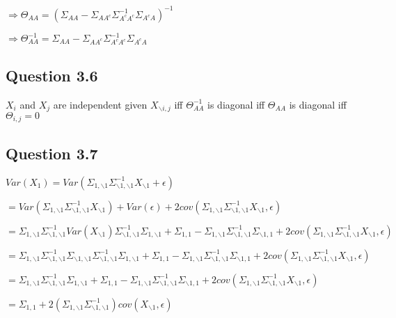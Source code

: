 \documentclass[
]{article}
\begin{document}
\(\Rightarrow \Theta_{AA} = (\Sigma_{AA} - \Sigma_{AA^c}\Sigma_{A^cA^c}^{-1}\Sigma_{A^cA})^{-1}\)

\(\Rightarrow \Theta_{AA}^{-1} = \Sigma_{AA} - \Sigma_{AA^c}\Sigma_{A^cA^c}^{-1}\Sigma_{A^cA}\)

\hypertarget{question-3.6}{%
\subsection{Question 3.6}\label{question-3.6}}

\(X_i\) and \(X_j\) are independent given \(X_{\backslash{i, j}}\) iff
\(\Theta_{AA}^{-1}\) is diagonal iff \(\Theta_{AA}\) is diagonal iff
\(\Theta_{i, j} = 0\)

\hypertarget{question-3.7}{%
\subsection{Question 3.7}\label{question-3.7}}

\(Var(X_1)=Var(\Sigma_{1,\backslash1}\Sigma^{-1}_{\backslash1,\backslash1}X_{\backslash1}+\epsilon)\)

\(=Var(\Sigma_{1,\backslash1}\Sigma^{-1}_{\backslash1,\backslash1}X_{\backslash1})+Var(\epsilon)+2cov(\Sigma_{1,\backslash1}\Sigma^{-1}_{\backslash1,\backslash1}X_{\backslash1},\epsilon)\)

\(=\Sigma_{1,\backslash1}\Sigma^{-1}_{\backslash1,\backslash1}Var(X_{\backslash1})\Sigma^{-1}_{\backslash1,\backslash1}\Sigma_{1,\backslash1}+\Sigma_{1,1}-\Sigma_{1,\backslash1}\Sigma^{-1}_{\backslash1,\backslash1}\Sigma_{\backslash1,1}+2cov(\Sigma_{1,\backslash1}\Sigma^{-1}_{\backslash1,\backslash1}X_{\backslash1},\epsilon)\)

\(=\Sigma_{1,\backslash1}\Sigma^{-1}_{\backslash1,\backslash1}\Sigma_{\backslash1,\backslash1}\Sigma^{-1}_{\backslash1,\backslash1}\Sigma_{1,\backslash1}+\Sigma_{1,1}-\Sigma_{1,\backslash1}\Sigma^{-1}_{\backslash1,\backslash1}\Sigma_{\backslash1,1}+2cov(\Sigma_{1,\backslash1}\Sigma^{-1}_{\backslash1,\backslash1}X_{\backslash1},\epsilon)\)

\(=\Sigma_{1,\backslash1}\Sigma^{-1}_{\backslash1,\backslash1}\Sigma_{1,\backslash1}+\Sigma_{1,1}-\Sigma_{1,\backslash1}\Sigma^{-1}_{\backslash1,\backslash1}\Sigma_{\backslash1,1}+2cov(\Sigma_{1,\backslash1}\Sigma^{-1}_{\backslash1,\backslash1}X_{\backslash1},\epsilon)\)

\(=\Sigma_{1,1}+2(\Sigma_{1,\backslash1}\Sigma^{-1}_{\backslash1,\backslash1})cov(X_{\backslash1},\epsilon)\)
\end{document}
